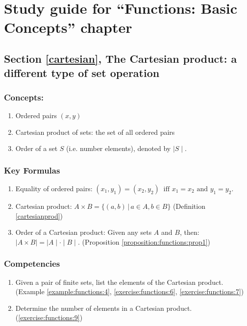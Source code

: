 \section{Study guide  for ``Functions: Basic Concepts''  chapter}
\label{sec:Functions:StudyGuide} 

\subsection*{Section \ref{cartesian}, The Cartesian product: a different type of set operation}
\subsubsection*{Concepts:}
\begin{enumerate}
\item 
Ordered pairs $(x, y)$
\item
Cartesian product of sets: the set of all ordered pairs
\item
Order of a set $S$ (i.e. number elements), denoted by $\mid S\mid $.
\end{enumerate}

\subsubsection*{Key Formulas}
\begin{enumerate}
\item
Equality of ordered pairs: $(x_{1}, y_{1}) = (x_{2}, y_{2})~ \mbox{ iff }  x_{1} = x_{2} \mbox{ and } y_{1} = y_{2}.$
\item
Cartesian product: $A \times B = \{ (a, b) \, | \, a \in A, b \in B \}$  (Definition \ref{cartesianprod})
\item
Order of a Cartesian product: Given any sets $A$ and $B$, then: \\ $\mid A \times B \mid = \mid A \mid \cdot \mid B \mid. $ (Proposition \ref{proposition:functions:prop1})
\end{enumerate}

\subsubsection*{Competencies}
\begin{enumerate}
\item
Given a pair of finite sets, list the elements of the Cartesian product. (Example \ref{example:functions:4}, \ref{exercise:functions:6}, \ref{exercise:functions:7})
\item
Determine the number of elements in a Cartesian product. (\ref{exercise:functions:9})
\end{enumerate}


